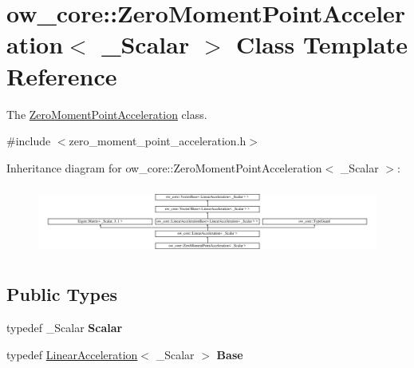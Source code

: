 \hypertarget{classow__core_1_1ZeroMomentPointAcceleration}{}\section{ow\+\_\+core\+:\+:Zero\+Moment\+Point\+Acceleration$<$ \+\_\+\+Scalar $>$ Class Template Reference}
\label{classow__core_1_1ZeroMomentPointAcceleration}


The \hyperlink{classow__core_1_1ZeroMomentPointAcceleration}{Zero\+Moment\+Point\+Acceleration} class.  




{\ttfamily \#include $<$zero\+\_\+moment\+\_\+point\+\_\+acceleration.\+h$>$}

Inheritance diagram for ow\+\_\+core\+:\+:Zero\+Moment\+Point\+Acceleration$<$ \+\_\+\+Scalar $>$\+:\begin{figure}[H]
\begin{center}
\leavevmode
\includegraphics[height=2.270884cm]{da/d96/classow__core_1_1ZeroMomentPointAcceleration}
\end{center}
\end{figure}
\subsection*{Public Types}
\begin{DoxyCompactItemize}
\item 
typedef \+\_\+\+Scalar {\bfseries Scalar}\hypertarget{classow__core_1_1ZeroMomentPointAcceleration_a53e6ffbb8935752f606f980108134ded}{}\label{classow__core_1_1ZeroMomentPointAcceleration_a53e6ffbb8935752f606f980108134ded}

\item 
typedef \hyperlink{classow__core_1_1LinearAcceleration}{Linear\+Acceleration}$<$ \+\_\+\+Scalar $>$ {\bfseries Base}\hypertarget{classow__core_1_1ZeroMomentPointAcceleration_a0afe732679cc8c10a517847cd0dd42d7}{}\label{classow__core_1_1ZeroMomentPointAcceleration_a0afe732679cc8c10a517847cd0dd42d7}

\end{DoxyCompactItemize}
